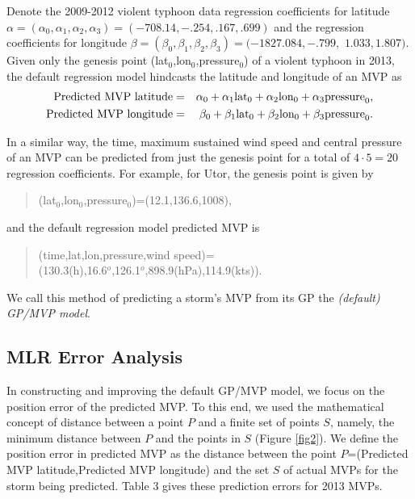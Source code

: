 \documentclass[a4paper, 12pt]{article}
\begin{document}
{             Denote the 2009-2012 violent typhoon data regression coefficients for latitude $\alpha=(\alpha_0, \alpha_1, \alpha_2, \alpha_3)=(-708.14,-.254,.167,.699)$  and the regression coefficients for longitude $\beta=(\beta_0, \beta_1, \beta_2, \beta_3)= (-1827.084, -.799,$ $1.033, 1.807)$.  Given only the genesis point (lat$_0$,lon$_0$,pressure$_0$) of a violent typhoon in 2013, the default regression model hindcasts the  latitude and longitude of an MVP as
              \begin{eqnarray*}
       \textup{Predicted MVP latitude} & = & \alpha_0+ \alpha_1 \textup{lat}_0 +  \alpha_2 \textup{lon}_0 + \alpha_3 \textup{pressure}_0,\\
        \textup{Predicted MVP longitude} & = & \beta_0+ \beta_1 \textup{lat}_0 +  \beta_2 \textup{lon}_0 + \beta_3 \textup{pressure}_0.\\
       \end{eqnarray*}




         {\flushleft  In} a similar way, the time, maximum sustained wind speed and central pressure of an MVP can be predicted from just the genesis point for a total of $4 \cdot 5 = 20$ regression coefficients.  For example, for Utor, the genesis point is given by
         \begin{quote}
         \centering
         (lat$_0$,lon$_0$,pressure$_0$)=(12.1,136.6,1008),
         \end{quote}
         {\flushleft and}  the default regression model predicted MVP is

               \begin{quote}
                 \centering
          (time,lat,lon,pressure,wind speed)=\\(130.3(h),16.6$^o$,126.1$^o$,898.9(hPa),114.9(kts)).
          \end{quote}

{\flushleft We} call this method of predicting a storm's MVP from its GP the \emph{(default) GP/MVP model}.


\subsection{MLR Error Analysis}

         In constructing and improving the default GP/MVP model, we focus on the position error of the predicted MVP. To this end, we used the mathematical concept of distance between a point $P$ and a finite set of points $S$, namely, the minimum distance between $P$ and the points in $S$ (Figure \ref{fig2}). We define the position error in predicted MVP as the distance between the point  $P$=(Predicted MVP latitude,Predicted MVP longitude) and the set $S$ of actual MVPs for the storm being predicted. Table 3 gives these prediction errors for 2013 MVPs.


}
\end{document}
